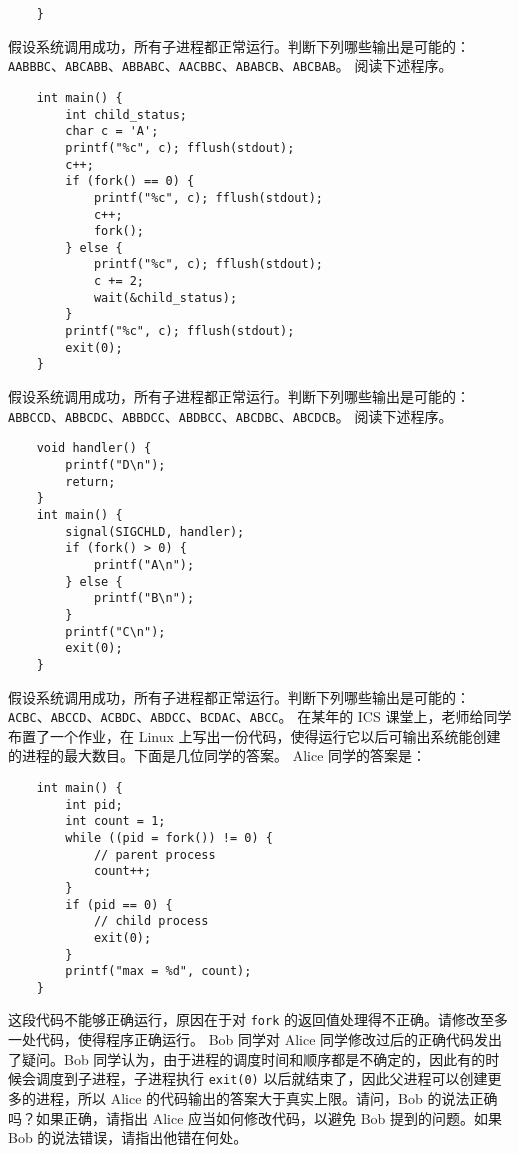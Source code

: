 \begin{problems}
\begin{verbatim}
    }
        \end{verbatim}
        假设系统调用成功，所有子进程都正常运行。判断下列哪些输出是可能的：\verb|AABBBC|、\verb|ABCABB|、\verb|ABBABC|、\verb|AACBBC|、\verb|ABABCB|、\verb|ABCBAB|。
        \pro 阅读下述程序。
        \begin{verbatim}
    int main() {
        int child_status;
        char c = 'A';
        printf("%c", c); fflush(stdout);
        c++;
        if (fork() == 0) {
            printf("%c", c); fflush(stdout);
            c++;
            fork();
        } else {
            printf("%c", c); fflush(stdout);
            c += 2;
            wait(&child_status);
        } 
        printf("%c", c); fflush(stdout);
        exit(0);
    }
        \end{verbatim}
        假设系统调用成功，所有子进程都正常运行。判断下列哪些输出是可能的：\verb|ABBCCD|、\verb|ABBCDC|、\verb|ABBDCC|、\verb|ABDBCC|、\verb|ABCDBC|、\verb|ABCDCB|。
        \pro 阅读下述程序。
        \begin{verbatim}
    void handler() {
        printf("D\n");
        return;
    }
    int main() {
        signal(SIGCHLD, handler);
        if (fork() > 0) {
            printf("A\n");
        } else {
            printf("B\n");
        } 
        printf("C\n");
        exit(0);
    }
        \end{verbatim}
        假设系统调用成功，所有子进程都正常运行。判断下列哪些输出是可能的：\verb|ACBC|、\verb|ABCCD|、\verb|ACBDC|、\verb|ABDCC|、\verb|BCDAC|、\verb|ABCC|。
        \pro 在某年的 ICS 课堂上，老师给同学布置了一个作业，在 Linux 上写出一份代码，使得运行它以后可输出系统能创建的进程的最大数目。下面是几位同学的答案。
            \qn Alice 同学的答案是：
            \begin{verbatim}
    int main() {
        int pid;
        int count = 1;
        while ((pid = fork()) != 0) {
            // parent process
            count++;
        } 
        if (pid == 0) {
            // child process
            exit(0);
        } 
        printf("max = %d", count);
    }
            \end{verbatim}
            这段代码不能够正确运行，原因在于对 \verb|fork| 的返回值处理得不正确。请修改至多一处代码，使得程序正确运行。
            \qn Bob 同学对 Alice 同学修改过后的正确代码发出了疑问。Bob 同学认为，由于进程的调度时间和顺序都是不确定的，因此有的时候会调度到子进程，子进程执行 \verb|exit(0)| 以后就结束了，因此父进程可以创建更多的进程，所以 Alice 的代码输出的答案大于真实上限。请问，Bob 的说法正确吗？如果正确，请指出 Alice 应当如何修改代码，以避免 Bob 提到的问题。如果 Bob 的说法错误，请指出他错在何处。

\end{problems}
